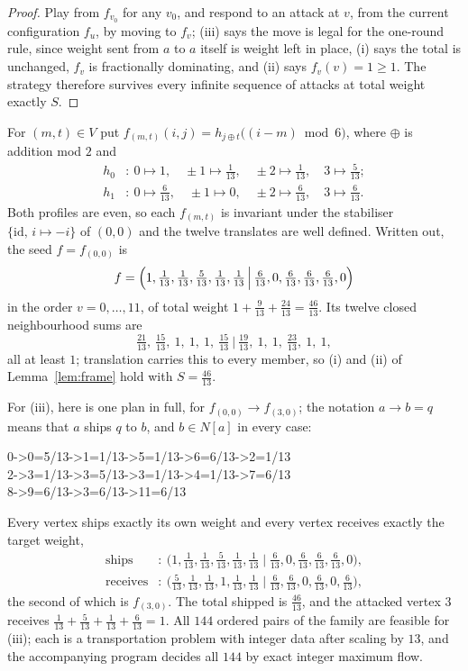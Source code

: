 \documentclass[11pt]{amsart}
\theoremstyle{remark}
\begin{document}
\begin{proof}
Play from $f_{v_0}$ for any $v_0$, and respond to an attack at $v$, from the
current configuration $f_u$, by moving to $f_v$; (iii) says the move is legal
for the one-round rule, since weight sent from $a$ to $a$ itself is weight left
in place, (i) says the total is unchanged, $f_v$ is fractionally dominating,
and (ii) says $f_v(v)=1\ge1$. The strategy therefore survives every infinite
sequence of attacks at total weight exactly $S$.
\end{proof}

For $(m,t)\in V$ put $f_{(m,t)}(i,j)=h_{j\oplus t}\bigl((i-m)\bmod6\bigr)$,
where $\oplus$ is addition mod $2$ and
\[
\begin{aligned}
  h_0&:\ 0\mapsto1,\quad \pm1\mapsto\tfrac1{13},\quad
        \pm2\mapsto\tfrac1{13},\quad 3\mapsto\tfrac5{13};\\
  h_1&:\ 0\mapsto\tfrac6{13},\quad \pm1\mapsto0,\quad
        \pm2\mapsto\tfrac6{13},\quad 3\mapsto\tfrac6{13}.
\end{aligned}
\]
Both profiles are even, so each $f_{(m,t)}$ is invariant under the stabiliser
$\{\mathrm{id},\,i\mapsto-i\}$ of $(0,0)$ and the twelve translates are well
defined. Written out, the seed $f=f_{(0,0)}$ is
\[
  f=\Bigl(1,\tfrac1{13},\tfrac1{13},\tfrac5{13},\tfrac1{13},\tfrac1{13}
   \,\Big|\,\tfrac6{13},0,\tfrac6{13},\tfrac6{13},\tfrac6{13},0\Bigr)
\]
in the order $v=0,\dots,11$, of total weight
$1+\tfrac9{13}+\tfrac{24}{13}=\tfrac{46}{13}$. Its twelve closed neighbourhood
sums are
\[
  \tfrac{21}{13},\ \tfrac{15}{13},\ 1,\ 1,\ 1,\ \tfrac{15}{13}
  \ \Big|\
  \tfrac{19}{13},\ 1,\ 1,\ \tfrac{23}{13},\ 1,\ 1,
\]
all at least $1$; translation carries this to every
member, so (i) and (ii) of Lemma~\ref{lem:frame} hold with
$S=\tfrac{46}{13}$.

For (iii), here is one plan in full, for $f_{(0,0)}\to f_{(3,0)}$; the notation
$a\!\to\!b=q$ means that $a$ ships $q$ to $b$, and $b\in N[a]$ in every case:
\begin{center}\ttfamily\small
0->0=5/13->1=1/13->5=1/13->6=6/13->2=1/13\\
2->3=1/13\quad 3->3=5/13\quad 4->3=1/13\quad 5->4=1/13\quad 6->7=6/13\\
8->9=6/13\quad 9->3=6/13\quad 10->11=6/13
\end{center}
Every vertex ships exactly its own weight and every vertex receives exactly the
target weight,
\[
\begin{aligned}
 \text{ships}&:\ \bigl(1,\tfrac1{13},\tfrac1{13},\tfrac5{13},\tfrac1{13},
   \tfrac1{13}\mid\tfrac6{13},0,\tfrac6{13},\tfrac6{13},\tfrac6{13},0\bigr),\\
 \text{receives}&:\ \bigl(\tfrac5{13},\tfrac1{13},\tfrac1{13},1,\tfrac1{13},
   \tfrac1{13}\mid\tfrac6{13},\tfrac6{13},0,\tfrac6{13},0,\tfrac6{13}\bigr),
\end{aligned}
\]
the second of which is $f_{(3,0)}$. The total shipped
is $\tfrac{46}{13}$, and the attacked vertex $3$ receives
$\tfrac1{13}+\tfrac5{13}+\tfrac1{13}+\tfrac6{13}=1$. All $144$ ordered pairs
of the family are feasible for (iii); each is a transportation problem with
integer data after scaling by $13$, and the accompanying program decides all
$144$ by exact integer maximum flow.
\end{document}
